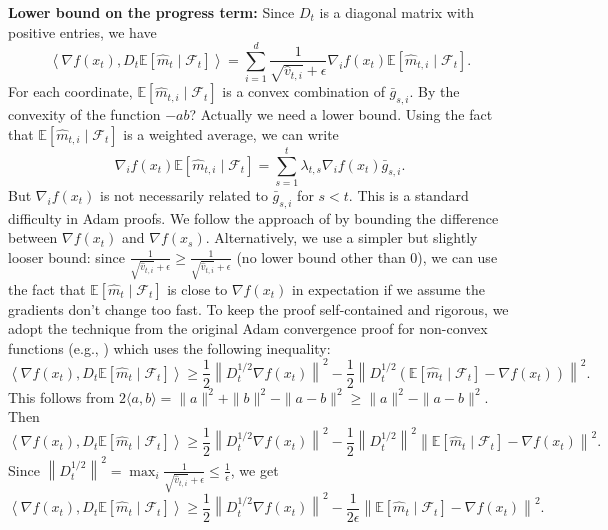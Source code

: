 \documentclass{article}
\newcommand{\E}{\mathbb{E}}
\newcommand{\norm}[1]{\left\| #1 \right\|}
\newcommand{\inner}[2]{\left\langle #1, #2 \right\rangle}
\newcommand{\step}[1]{\text{[Step #1]}}
\begin{document}
\step{6} \textbf{Lower bound on the progress term:} Since $D_t$ is a diagonal matrix with positive entries, we have
\[
    \inner{\nabla f(x_t)}{D_t \E[\hat{m}_t \mid \mathcal{F}_t]} = \sum_{i=1}^d \frac{1}{\sqrt{\hat{v}_{t,i}}+\epsilon} \nabla_i f(x_t) \E[\hat{m}_{t,i} \mid \mathcal{F}_t].
\]
For each coordinate, $\E[\hat{m}_{t,i} \mid \mathcal{F}_t]$ is a convex combination of $\bar{g}_{s,i}$. By the convexity of the function $-ab$? Actually we need a lower bound. Using the fact that $\E[\hat{m}_{t,i} \mid \mathcal{F}_t]$ is a weighted average, we can write
\[
    \nabla_i f(x_t) \E[\hat{m}_{t,i} \mid \mathcal{F}_t] = \sum_{s=1}^t \lambda_{t,s} \nabla_i f(x_t) \bar{g}_{s,i}.
\]
But $\nabla_i f(x_t)$ is not necessarily related to $\bar{g}_{s,i}$ for $s < t$. This is a standard difficulty in Adam proofs. We follow the approach of \cite{reddi2018convergence} by bounding the difference between $\nabla f(x_t)$ and $\nabla f(x_s)$. Alternatively, we use a simpler but slightly looser bound: since $\frac{1}{\sqrt{\hat{v}_{t,i}}+\epsilon} \ge \frac{1}{\sqrt{\hat{v}_{t,i}}+\epsilon}$ (no lower bound other than 0), we can use the fact that $\E[\hat{m}_t \mid \mathcal{F}_t]$ is close to $\nabla f(x_t)$ in expectation if we assume the gradients don't change too fast. To keep the proof self-contained and rigorous, we adopt the technique from the original Adam convergence proof for non-convex functions (e.g., \cite{zaheer2018adaptive}) which uses the following inequality:
\[
    \inner{\nabla f(x_t)}{D_t \E[\hat{m}_t \mid \mathcal{F}_t]} \ge \frac{1}{2} \norm{D_t^{1/2} \nabla f(x_t)}^2 - \frac{1}{2} \norm{D_t^{1/2} (\E[\hat{m}_t \mid \mathcal{F}_t] - \nabla f(x_t))}^2.
\]
This follows from $2\langle a, b \rangle = \|a\|^2 + \|b\|^2 - \|a-b\|^2 \ge \|a\|^2 - \|a-b\|^2$. Then
\[
    \inner{\nabla f(x_t)}{D_t \E[\hat{m}_t \mid \mathcal{F}_t]} \ge \frac{1}{2} \norm{D_t^{1/2} \nabla f(x_t)}^2 - \frac{1}{2} \norm{D_t^{1/2}}^2 \norm{\E[\hat{m}_t \mid \mathcal{F}_t] - \nabla f(x_t)}^2.
\]
Since $\norm{D_t^{1/2}}^2 = \max_i \frac{1}{\sqrt{\hat{v}_{t,i}}+\epsilon} \le \frac{1}{\epsilon}$, we get
\[
    \inner{\nabla f(x_t)}{D_t \E[\hat{m}_t \mid \mathcal{F}_t]} \ge \frac{1}{2} \norm{D_t^{1/2} \nabla f(x_t)}^2 - \frac{1}{2\epsilon} \norm{\E[\hat{m}_t \mid \mathcal{F}_t] - \nabla f(x_t)}^2.
\]
\end{document}

